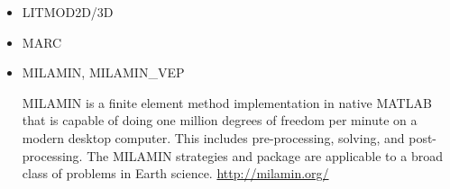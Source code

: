 \begin{itemize}
\begin{scriptsize}
\twothousandfive: \textcite{sopg05}, \textcite{baso05}, \textcite{soba05}\\
\twothousandsix: \textcite{bube06}, \textcite{basv06}, \textcite{sobk06}\textcite{peso06}\\
\twothousandeight: \textcite{peso08}, \textcite{baso08}, \textcite{scbe08}
\textcite{sosk11}
\end{scriptsize}

\item LITMOD2D/3D

\begin{scriptsize}
\textcite{afrf07}
\textcite{affr08}
\textcite{fuac09}
\textcite{fufa10}
\textcite{jitf19}
\end{scriptsize}

\item MARC

\begin{scriptsize}
\noindent
\textcite{nesg97}
\textcite{nesb99}
\end{scriptsize}


\item {\codefont MILAMIN, MILAMIN\_VEP} 

MILAMIN is a finite element method implementation in native MATLAB that is capable 
of doing one million degrees of freedom per minute on a modern desktop computer. 
This includes pre-processing, solving, and post-processing. The MILAMIN strategies and 
package are applicable to a broad class of problems in Earth science. \url{http://milamin.org/}


\end{itemize}
